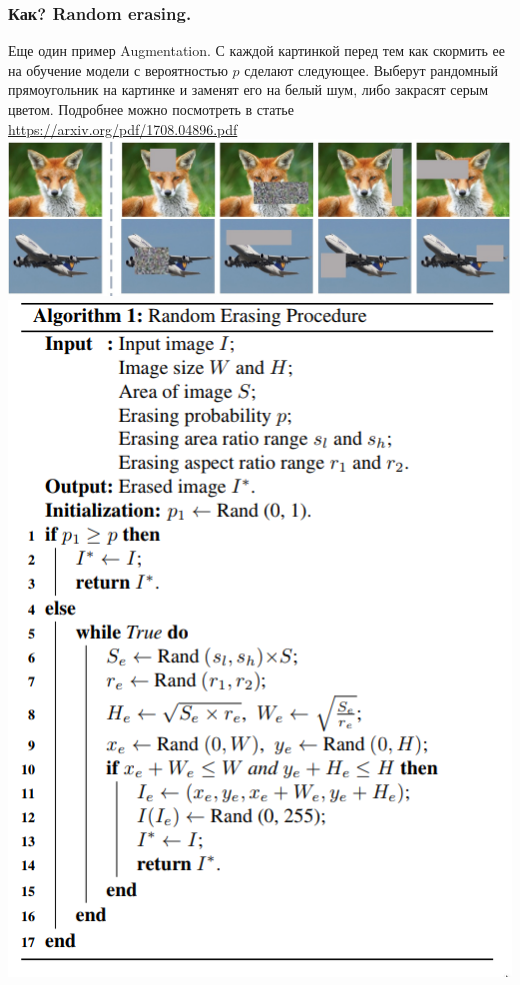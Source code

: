 \documentclass{beamer}
\begin{document}
\begin{frame}
  \frametitle{Как? Random erasing.}
  Еще один пример Augmentation. С каждой картинкой перед тем как скормить ее на
  обучение модели с вероятностью $p$ сделают следующее. Выберут рандомный
  прямоугольник на картинке и заменят его на белый шум, либо закрасят серым
  цветом. Подробнее можно посмотреть в статье
  \href{https://arxiv.org/pdf/1708.04896.pdf}
  {https://arxiv.org/pdf/1708.04896.pdf}
  \includegraphics[width=1\textwidth]{erasing.jpg}
  \endminipage
  \includegraphics[width=1\textwidth]{random_erasing_algo.png}
  \endminipage
\end{frame}
\end{document}
